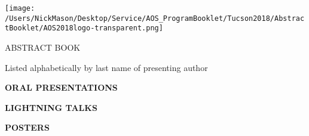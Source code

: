 \documentclass[twoside]{article}
\begin{document}
\thispagestyle{empty}
\pagestyle{fancy}

\setlength{\parindent}{0cm}

\newcommand\normaltalk[3]{%
	\textbf{#1}
	
	\vspace{12pt}
	
	#2

	\vspace{12pt}
	
        #3
	
	\begin{center}
        \noindent\rule{2cm}{0.4pt}	
        \end{center}
        
}

\vspace{20pt}
\begin{center}
    \texttt{[image: /Users/NickMason/Desktop/Service/AOS\_ProgramBooklet/Tucson2018/AbstractBooklet/AOS2018logo-transparent.png]}
    
    \vspace{20pt}
    
    \huge{ABSTRACT BOOK}
   
    \vspace{20pt}
    
    \huge{Listed alphabetically by last name of presenting author}
    
    \tableofcontents

	
\end{center}

\newpage

\begin{center}
\Large{\textbf{ORAL PRESENTATIONS}}
\end{center}

\begin{multicols*}{2}

\end{multicols*}

\newpage

\begin{center}
\Large{\textbf{LIGHTNING TALKS}}
\end{center}

\begin{multicols*}{2}

\end{multicols*}


\newpage

\begin{center}
\Large{\textbf{POSTERS}}
\end{center}

\begin{multicols*}{2}

\end{multicols*}
\end{document}
